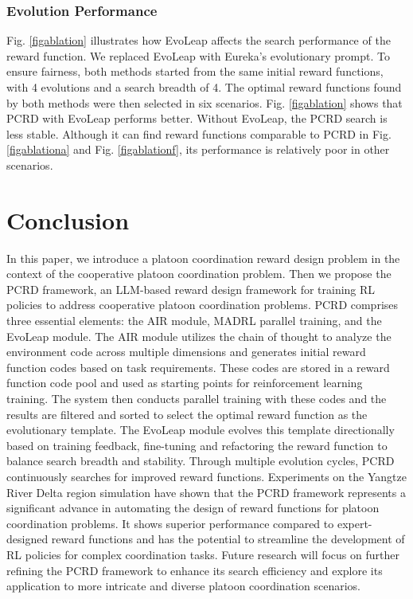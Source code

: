 \documentclass[lettersize,journal]{IEEEtran}
\begin{document}
\subsubsection{Evolution Performance}
Fig. \ref{figablation} illustrates how EvoLeap affects the search performance of the reward function. 
We replaced EvoLeap with Eureka's evolutionary prompt. 
To ensure fairness, both methods started from the same initial reward functions, with 4 evolutions and a search breadth of 4.
The optimal reward functions found by both methods were then selected in six scenarios. 
Fig. \ref{figablation} shows that PCRD with EvoLeap performs better. Without EvoLeap, the PCRD search is less stable. 
Although it can find reward functions comparable to PCRD in Fig. \ref{figablationa} and Fig. \ref{figablationf}, its performance is relatively poor in other scenarios.

\section{Conclusion}
In this paper, we introduce a platoon coordination reward design problem in the context of the cooperative platoon coordination problem.
Then we propose the PCRD framework, an LLM-based reward design framework for training RL policies to address cooperative platoon coordination problems. 
PCRD comprises three essential elements: the AIR module, MADRL parallel training, and the EvoLeap module. 
The AIR module utilizes the chain of thought to analyze the environment code across multiple dimensions and generates initial reward function codes based on task requirements. 
These codes are stored in a reward function code pool and used as starting points for reinforcement learning training. 
The system then conducts parallel training with these codes and the results are filtered and sorted to select the optimal reward function as the evolutionary template. 
The EvoLeap module evolves this template directionally based on training feedback, fine-tuning and refactoring the reward function to balance search breadth and stability. 
Through multiple evolution cycles, PCRD continuously searches for improved reward functions.
Experiments on the Yangtze River Delta region simulation have shown that the PCRD framework represents a significant advance in automating the design of reward functions for platoon coordination problems. 
It shows superior performance compared to expert-designed reward functions and has the potential to streamline the development of RL policies for complex coordination tasks. 
Future research will focus on further refining the PCRD framework to enhance its search efficiency and explore its application to more intricate and diverse platoon coordination scenarios.









\small

\end{document}

